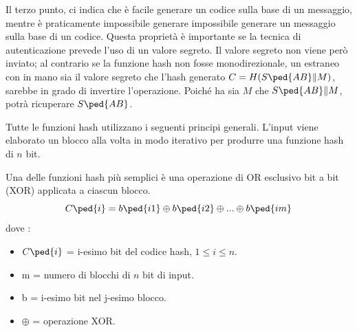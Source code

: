 Il terzo punto, ci indica che è facile generare un codice sulla base di un messaggio, mentre è praticamente impossibile generare impossibile generare un messaggio sulla base di un codice. Questa proprietà è importante se la tecnica di autenticazione prevede l'uso di un valore segreto. Il valore segreto non viene però inviato; al contrario se la funzione hash non fosse monodirezionale, un estraneo con in mano sia il valore segreto che l'hash generato \(C = H(S\ped{AB} \| M)\), sarebbe in grado di invertire l'operazione. Poiché ha sia \(M\) che \(S\ped{AB} \| M\), potrà ricuperare \(S\ped{AB}\).

Tutte le funzioni hash utilizzano i seguenti principi generali. L'input viene elaborato un blocco alla volta in modo iterativo per produrre una funzione hash di \(n\) bit.

Una delle funzioni hash più semplici è una operazione di OR esclusivo bit a bit (XOR) applicata a ciascun blocco.
\[ C\ped{i} = b\ped{i1} \oplus b\ped{i2} \oplus ... \oplus b\ped{im}\]
\newline
dove : 

\begin{itemize}
    \item \(C\ped{i}\) = i-esimo bit del codice hash, \(1 \leq i \leq n\).
    \item m = numero di blocchi di \(n\) bit di input.
    \item b = i-esimo bit nel j-esimo blocco.
    \item \(\oplus\) = operazione XOR.
\end{itemize}

